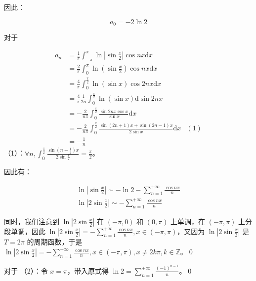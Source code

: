 因此：


\begin{equation*}
	a_{0} =-2\ln 2
\end{equation*}


对于


\begin{align*}
	a_{n} & =\frac{1}{\pi }\int _{-\pi }^{\pi }\ln\left| \sin\frac{x}{2}\right| \cos nx\mathrm{d} x & \\
	& =\frac{2}{\pi }\int _{0}^{\pi }\ln\left(\sin\frac{x}{2}\right)\cos nx\mathrm{d} x & \\
	& =\frac{4}{\pi }\int _{0}^{\frac{\pi }{2}}\ln(\sin x)\cos 2nx\mathrm{d} x & \\
	& =\frac{4}{\pi }\frac{1}{2n}\int _{0}^{\frac{\pi }{2}}\ln(\sin x)\mathrm{d}\sin 2nx & \\
	& =-\frac{2}{n\pi }\int _{0}^{\frac{\pi }{2}}\frac{\sin 2nx\cos x}{\sin x}\mathrm{d} x & \\
	& =-\frac{2}{n\pi }\int _{0}^{\frac{\pi }{2}}\frac{\sin( 2n+1) x+\sin( 2n-1) x}{2\sin x}\mathrm{d} x & ( 1)\\
	& =-\frac{1}{n} & 
\end{align*}
（1）：$\displaystyle \forall n,\int _{0}^{\frac{\pi }{2}}\frac{\sin\left( n+\frac{1}{2}\right) x}{2\sin\frac{x}{2}} =\frac{\pi }{2}$。

因此有：


\begin{gather*}
	\ln\left| \sin\frac{x}{2}\right| \sim -\ln 2-\sum _{n=1}^{+\infty }\frac{\cos nx}{n}\\
	\ln\left| 2\sin\frac{x}{2}\right| \sim -\sum _{n=1}^{+\infty }\frac{\cos nx}{n}
\end{gather*}


同时，我们注意到 $\displaystyle \ln\left| 2\sin\frac{x}{2}\right| $ 在 $\displaystyle ( -\pi ,0)$ 和 $\displaystyle ( 0,\pi )$ 上单调，在 $\displaystyle ( -\pi ,\pi )$ 上分段单调，因此 $\displaystyle \ln\left| 2\sin\frac{x}{2}\right| =-\sum _{n=1}^{+\infty }\frac{\cos nx}{n} ,x\in ( -\pi ,\pi )$，又因为 $\displaystyle \ln\left| 2\sin\frac{x}{2}\right| $ 是 $\displaystyle T=2\pi $ 的周期函数，于是 $\displaystyle \ln\left| 2\sin\frac{x}{2}\right| =-\sum _{n=1}^{+\infty }\frac{\cos nx}{n} ,x\in ( -\pi ,\pi ) ,x\neq 2k\pi ,k\in \mathbb{Z}$。\qed 

对于 （2）：令 $\displaystyle x=\pi $，带入原式得 $\displaystyle \ln 2=\sum _{n=1}^{+\infty }\frac{( -1)^{n-1}}{n}$。\qed 





